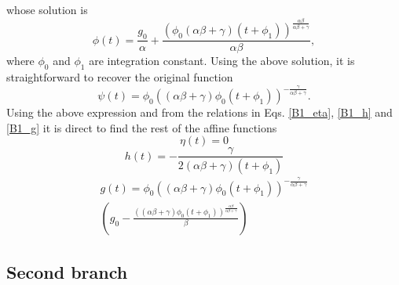 whose solution is
\begin{equation}
    \phi(t) = \frac{g_0}{\alpha} + \frac{\left(\phi_0 \left(\alpha\beta + \gamma\right) \left(t +  \phi_1\right)\right)^{\frac{\alpha\beta}{\alpha\beta + \gamma}}}{\alpha\beta},
\end{equation}
where $\phi_0$ and $\phi_1$ are integration constant. Using the above solution, it is straightforward to recover the original function
\begin{equation}
    \psi(t) = \phi_0 \left(\left(\alpha\beta + \gamma\right)\phi_0\left(t + \phi_1\right)\right)^{-\frac{\gamma}{\alpha\beta + \gamma}}.
\end{equation}
Using the above expression and from the relations in Eqs. \eqref{B1_eta}, \eqref{B1_h} and \eqref{B1_g} it is direct to find the rest of the
affine functions
\begin{dmath}
\eta(t)  = 0
\end{dmath}
\begin{dmath}
h(t) = - \frac{\gamma}{2\left(\alpha\beta + \gamma\right)\left(t + \phi_1\right)}
\end{dmath}
\begin{multline}
g(t)  = \phi_0 \left(\left(\alpha\beta + \gamma\right)\phi_0 \left(t + \phi_1\right)\right)^{-\frac{\gamma}{\alpha\beta + \gamma}} \\
\left(g_0 - \frac{\left(\left(\alpha\beta + \gamma\right)\phi_0\left(t + \phi_1\right)\right)^{\frac{\alpha\beta}{\alpha\beta + \gamma}}}{\beta}\right)
\end{multline}


\subsection{Second branch}

